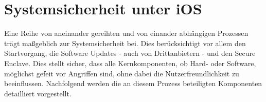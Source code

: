 \section{Systemsicherheit unter iOS}
	Eine Reihe von aneinander gereihten und von einander abhängigen Prozessen
	trägt maßgeblich zur Systemsicherheit bei. Dies berücksichtigt vor allem den
	Startvorgang, die Software Updates - auch von Drittanbietern - und den Secure
	Enclave. Dies stellt sicher, dass alle Kernkomponenten, ob Hard- oder
	Software, möglichst gefeit vor Angriffen sind, ohne dabei die
	Nutzerfreundlichkeit zu beeinflussen. Nachfolgend werden die an
	diesem Prozess beteiligten Komponenten detailliert vorgestellt.
